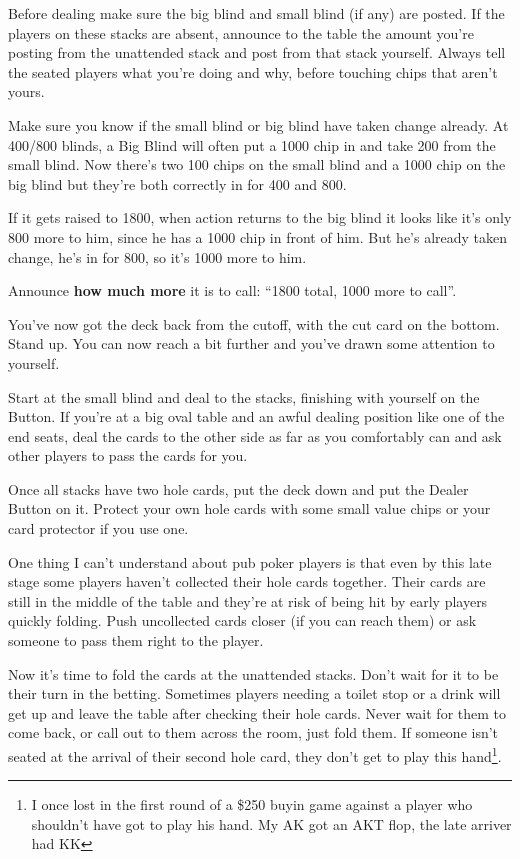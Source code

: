 Before dealing make sure the big blind and small blind (if any) are
posted. If the players on these stacks are absent, announce to the table
the amount you're posting from the unattended stack and post from
that stack yourself. Always tell the seated players what you're doing and why,
before touching chips that aren't yours.

Make sure you know if the small blind or big blind have taken change
already. At 400/800 blinds, a Big Blind will often put a 1000 chip in
and take 200 from the small blind. Now there's two 100 chips on the
small blind and a 1000 chip on the big blind but they're both correctly
in for 400 and 800.

If it gets raised to 1800, when action returns to the big blind it
looks like it's only 800 more to him, since he has a 1000 chip in front
of him. But he's already taken change, he's in for 800, so it's 1000 more
to him.

Announce \textbf{how much more} it is to call: ``1800 total,
1000 more to call''.

You've now got the deck back from the cutoff, with the cut card on
the bottom. Stand up. You can now reach a bit further
and you've drawn some attention to yourself.

Start at the small blind and deal to the stacks, finishing with yourself
on the Button. If you're at a big oval table and an awful dealing position like
one of the end seats, deal the cards to the other side as far as you comfortably
can and ask other players to pass the cards for you.

Once all stacks have two hole cards, put the deck down and put the Dealer
Button on it. Protect your own hole cards with some small value chips or
your card protector if you use one.

One thing I can't understand about pub poker players is that even by
this late stage some players haven't collected their hole cards together.
Their cards are still in the middle of the table and they're at risk
of being hit by early players quickly folding.  Push uncollected
cards closer (if you can reach them) or ask someone to
pass them right to the player.

Now it's time to fold the cards at the unattended stacks. Don't wait for
it to be their turn in the betting. Sometimes players needing a toilet
stop or a drink will get up and leave the table after checking their hole
cards. Never wait for them to come back, or call out to them across the
room, just fold them. If someone isn't seated at the arrival of their
second hole card, they don't get to play this hand\footnote{I once
lost in the first round of a \$250 buyin game against a player who
shouldn't have got to play his hand. My AK got an AKT flop, the late
arriver had KK}.

